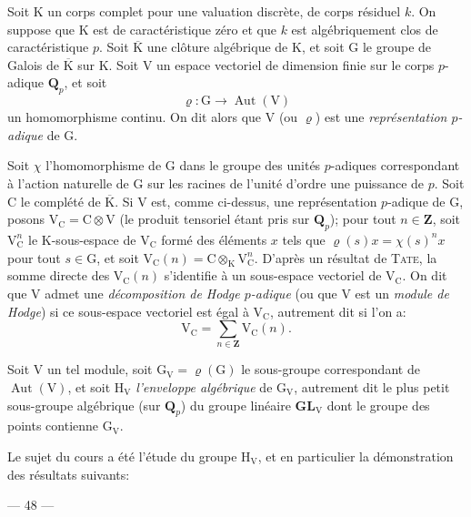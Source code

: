 Soit $\mathrm K$ un corps complet pour une valuation discrète, de corps résiduel $k$. On suppose que $\mathrm K$ est de caractéristique zéro et que $k$ est algébriquement clos de caractéristique $p$. Soit $\overline{\mathrm K}$ une clôture algébrique de $\mathrm K$, et soit $\mathrm G$ le groupe de Galois de $\overline{\mathrm K}$ sur $\mathrm K$. Soit $\mathrm V$ un espace vectoriel de dimension finie sur le corps $p$-adique $\mathbf Q_p$, et soit
\[
\varrho:\mathrm G\to\operatorname{Aut}(\mathrm V)
\]
un homomorphisme continu. On dit alors que $\mathrm V$ (ou $\varrho$) est une \textit{représentation $p$-adique} de $\mathrm G$.

Soit $\chi$ l'homomorphisme de $\mathrm G$ dans le groupe des unités $p$-adiques correspondant à l'action naturelle de $\mathrm G$ sur les racines de l'unité d'ordre une puissance de $p$. Soit $\mathrm C$ le complété de $\overline{\mathrm K}$. Si $\mathrm V$ est, comme ci-dessus, une représentation $p$-adique de $\mathrm G$, posons $\mathrm V_{\mathrm C}=\mathrm C\otimes\mathrm V$ (le produit tensoriel étant pris sur $\mathbf Q_p$); pour tout $n\in\mathbf Z$, soit $\mathrm V_{\mathrm C}^n$ le $\mathrm K$-sous-espace de $\mathrm V_{\mathrm C}$ formé des éléments $x$ tels que $\varrho(s)x=\chi(s)^nx$ pour tout $s\in\mathrm G$, et soit $\mathrm V_{\mathrm C}(n)=\mathrm C\otimes_{\mathrm K}\mathrm V_{\mathrm C}^n$. D'après un résultat de \textsc{Tate}, la somme directe des $\mathrm V_{\mathrm C}(n)$ s'identifie à un sous-espace vectoriel de $\mathrm V_{\mathrm C}$. On dit que $\mathrm V$ admet une \textit{décomposition de Hodge $p$-adique} (ou que $\mathrm V$ est un \textit{module de Hodge}) si ce sous-espace vectoriel est égal à $\mathrm V_{\mathrm C}$, autrement dit si l'on a:
\[
\mathrm V_{\mathrm C}=\sum_{n\in\mathbf Z}\mathrm V_{\mathrm C}(n).
\]

Soit $\mathrm V$ un tel module, soit $\mathrm G_{\mathrm V}=\varrho(\mathrm G)$ le sous-groupe correspondant de $\operatorname{Aut}(\mathrm V)$, et soit $\mathrm H_{\mathrm V}$ \textit{l'enveloppe algébrique} de $\mathrm G_{\mathrm V}$, autrement dit le plus petit sous-groupe algébrique (sur $\mathbf Q_p$) du groupe linéaire $\mathbf{GL}_{\mathrm V}$ dont le groupe des points contienne $\mathrm G_{\mathrm V}$.

Le sujet du cours a été l'étude du groupe $\mathrm H_{\mathrm V}$, et en particulier la démonstration des résultats suivants:

\begin{center}--- 48 ---\end{center}

